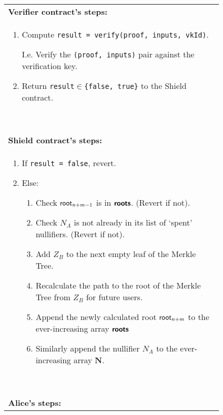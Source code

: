 \begin{figure}[htbp]
  \ContinuedFloat %
	\begin{center}
		\begin{framed}
      \begin{tabular}{p{16cm}}
       \textbf{ Verifier contract's steps:}\\
        \begin{enumerate}
          \setcounter{enumi}{\value{ongoingEnumCounter}}
          \item Compute \texttt{result = verify(proof, inputs, vkId)}.
          
          I.e. Verify the \texttt{(proof, inputs)} pair against the verification key.
          \item Return \texttt{result}$\in$\texttt{\{false, true\}} to the Shield contract.
          \setcounter{ongoingEnumCounter}{\value{enumi}}
        \end{enumerate}
        \ \\
        \midrule
        \textbf{Shield contract's steps:}\\
        \begin{enumerate}
          \setcounter{enumi}{\value{ongoingEnumCounter}}
          \item If \texttt{result = false}, revert.
          \item Else:
          \begin{enumerate}
            \item Check $\mathsf{root}_{n+m-1}$ is in $\bm{\mathsf{roots}}$. (Revert if not).
            \item Check $N_A$ is not already in its list of `spent' nullifiers. (Revert if not).
            \item Add $Z_B$ to the next empty leaf of the Merkle Tree.
            \item Recalculate the path to the root of the Merkle Tree from $Z_B$ for future users.
            \item Append the newly calculated root $\mathsf{root}_{n+m}$ to the ever-increasing array $\bm{\mathsf{roots}}$
            \item Similarly append the nullifier $N_{A}$ to the ever-increasing array $\bm N$.
          \end{enumerate}
          \setcounter{ongoingEnumCounter}{\value{enumi}}
        \end{enumerate}
        \ \\
        \midrule
        \textbf{Alice's steps:}\\

\end{tabular}
\end{framed}
\end{center}
\end{figure}
